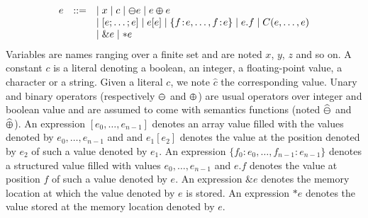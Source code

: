 \documentclass[12pt]{article}
\newcommand{\field}[2]{#1\!:\!#2}
\begin{document}
$$
\begin{array}{lcl}
e &::=& \mid x \mid c \mid \varominus e \mid e \varoplus e\\
&& \mid [e;\ldots;e] \mid e[e] \mid \{\field{f}{e},\ldots,\field{f}{e}\} 
    \mid e.f \mid C(e,\ldots,e)\\
&& \mid \&e \mid *e  
\end{array}
$$
Variables are names ranging over a finite set and are noted $x$, $y$, $z$ and so on.
A constant $c$ is a literal denoting a boolean, an integer, a floating-point value, a character or a string.
Given a literal $c$, we note $\widehat{c}$ the corresponding value.
Unary and binary  operators (respectively $\varominus$ and $\varoplus$) are usual operators over integer and
boolean value and are assumed to come with semantics functions (noted $\widehat{\varominus}$ 
and $\widehat{\varoplus}$). 
An expression $[e_0,\ldots,e_{n-1}]$ denotes an array value filled
with the values denoted by $e_0,\ldots,e_{n-1}$ and
and $e_1[e_2]$ denotes the value at the position denoted by $e_2$ of such a value 
denoted by $e_1$.
An expression $\{\field{f_0}{e_0},\ldots, \field{f_{n-1}}{e_{n-1}}\}$ denotes a 
structured value filled with values $e_0,\ldots,e_{n-1}$ and $e.f$ denotes the 
value at position $f$ of such a value denoted by $e$.
An expression $\&e$ denotes the memory location at which the value denoted by $e$ is stored.
An expression $*e$ denotes the value stored at the memory location denoted by $e$.
\end{document}
